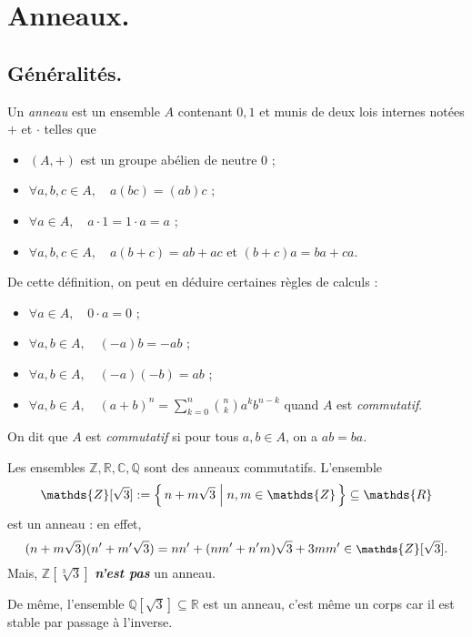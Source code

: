 \documentclass[./main]{subfiles}
\begin{document}
  \chapter{Anneaux.}

  \section{Généralités.}

  \begin{defn}
    Un \textit{anneau} est un ensemble $A$ contenant $0,1$ et munis de deux lois internes notées $+$ et $\cdot$ telles que 
    \begin{itemize}
      \item $(A, +)$ est un groupe abélien de neutre $0$ ;
      \item $\forall  a, b, c \in A, \quad a (b c) = (a b) c$ ;
      \item $\forall a \in A, \quad a \cdot 1 = 1 \cdot a = a$ ;
      \item $\forall a, b, c \in A, \quad a (b + c) = a b + a c$ et $(b + c) a = ba + ca$.
    \end{itemize}
  \end{defn}

  \begin{rmk}
    De cette définition, on peut en déduire certaines règles de calculs :
    \begin{itemize}
      \item $\forall a \in A, \quad 0 \cdot a = 0$ ;
      \item $\forall a,b \in A, \quad (-a) b = - ab$ ;
      \item $\forall  a, b \in A, \quad (-a)(-b) = ab$ ;
      \item $\forall a, b \in A, \quad (a+b)^n = \sum_{k=0}^n {n \choose k} a^k b^{n-k}$ quand $A$ est \textit{commutatif}.
    \end{itemize}
  \end{rmk}

  \begin{defn}
    On dit que $A$ est \textit{commutatif} si pour tous $a, b \in A$, on a $ab = ba$.
  \end{defn}

  \begin{exm}
    Les ensembles $\mathds{Z}, \mathds{R}, \mathds{C}, \mathds{Q}$ sont des anneaux commutatifs.
    L'ensemble  \[
      \mathds{Z}[\sqrt{3}] := \mleft\{\,n + m \sqrt{3} \;\middle|\; n,m \in \mathds{Z}\,\mright\} \subseteq \mathds{R}
    \] est un anneau : en effet, \[
    \small (n + m \sqrt{3})(n' + m' \sqrt{3}) = n n' + (n m' + n'm) \sqrt{3}  + 3 m m' \in \mathds{Z}[\sqrt{3}]
    .\] 
    Mais, $\mathds{Z}[\sqrt[3]{3}]$ \textit{\textbf{n'est pas}} un anneau.

    De même, l'ensemble $\mathds{Q}[\sqrt{3}] \subseteq \mathds{R}$ est un anneau, c'est même un corps car il est stable par passage à l'inverse.
  \end{exm}
\end{document}
